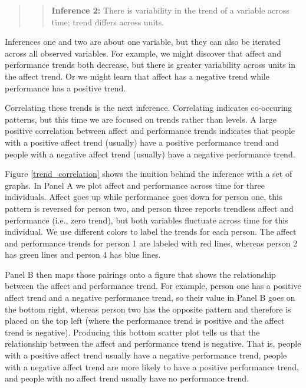 \documentclass[english,,man]{apa6}
\theoremstyle{definition}
\theoremstyle{definition}
\theoremstyle{definition}
\theoremstyle{remark}
\begin{document}
\begin{quote}
\begin{quote}
\textbf{Inference 2:} There is variability in the trend of a variable
across time; trend differs across units.
\end{quote}
\end{quote}

Inferences one and two are about one variable, but they can also be
iterated across all observed variables. For example, we might discover
that affect and performance trends both decrease, but there is greater
variability across units in the affect trend. Or we might learn that
affect has a negative trend while performance has a positive trend.

Correlating these trends is the next inference. Correlating indicates
co-occuring patterns, but this time we are focused on trends rather than
levels. A large positive correlation between affect and performance
trends indicates that people with a positive affect trend (usually) have
a positive performance trend and people with a negative affect trend
(usually) have a negative performance trend.

Figure \ref{trend_correlation} shows the inuition behind the inference
with a set of graphs. In Panel A we plot affect and performance across
time for three individuals. Affect goes up while performance goes down
for person one, this pattern is reversed for person two, and person
three reports trendless affect and performance (i.e., zero trend), but
both variables fluctuate across time for this individual. We use
different colors to label the trends for each person. The affect and
performance trends for person 1 are labeled with red lines, whereas
person 2 has green lines and person 4 has blue lines.

Panel B then maps those pairings onto a figure that shows the
relationship between the affect and performance trend. For example,
person one has a positive affect trend and a negative performance trend,
so their value in Panel B goes on the bottom right, whereas person two
has the opposite pattern and therefore is placed on the top left (where
the performance trend is positive and the affect trend is negative).
Producing this bottom scatter plot tells us that the relationship
between the affect and performance trend is negative. That is, people
with a positive affect trend usually have a negative performance trend,
people with a negative affect trend are more likely to have a positive
performance trend, and people with no affect trend usually have no
performance trend.
\end{document}
